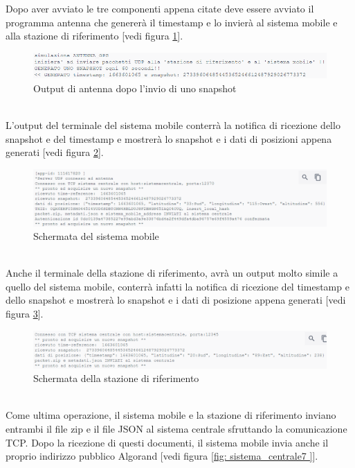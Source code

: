 Dopo aver avviato le tre componenti appena citate deve essere avviato il programma antenna che genererà il timestamp e lo invierà al sistema mobile e alla stazione di riferimento [vedi figura \ref{fig: antennaoutput }].
\begin{figure}[!h]
\flushleft
\includegraphics[scale=1.0]{images/simulazione/antennaoutput}
\caption{Output di antenna dopo l'invio di uno snapshot}
\label{fig: antennaoutput }
\end{figure}\\
L'output del terminale del sistema mobile conterrà la notifica di ricezione dello snapshot e del timestamp e mostrerà lo snapshot e i dati di posizioni appena generati [vedi figura \ref{fig: sistemamobile }].
\begin{figure}[!h]
\flushleft
\includegraphics[scale=0.8]{images/simulazione/outputsistemamobile.png}
\caption{Schermata del sistema mobile}
\label{fig: sistemamobile }
\end{figure}\\
Anche il terminale della stazione di riferimento, avrà un output molto simile a quello del sistema mobile, conterrà infatti la notifica di ricezione del timestamp e dello snapshot e mostrerà lo snapshot e i dati di posizione appena generati [vedi figura \ref{fig: sistema_centrale6 }].\\
\begin{figure}[!h]
\flushleft
\includegraphics[scale=0.8]{images/simulazione/outputstazioneriferimento.png}
\caption{Schermata della stazione di riferimento}
\label{fig: sistema_centrale6 }
\end{figure}\\
Come ultima operazione, il sistema mobile e la stazione di riferimento inviano entrambi il file zip e il file JSON al sistema centrale sfruttando la comunicazione TCP. Dopo la ricezione di questi documenti, il sistema mobile invia anche il proprio indirizzo pubblico Algorand [vedi figura \ref{fig: sistema_centrale7 }]. 
